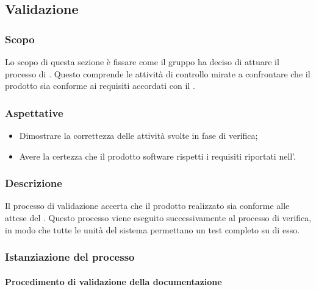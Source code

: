 \subsection{Validazione}
\subsubsection{Scopo}
Lo scopo di questa sezione è fissare come il gruppo ha deciso di attuare il processo di . Questo comprende le attività di controllo mirate a confrontare che il prodotto sia conforme ai requisiti accordati con il .

\subsubsection{Aspettative}
\begin{itemize}
	\item Dimostrare la correttezza delle attività svolte in fase di verifica; 
	\item Avere la certezza che il prodotto software rispetti i requisiti riportati nell'.
\end{itemize}

\subsubsection{Descrizione}
Il processo di validazione accerta che il prodotto realizzato sia conforme alle attese del . Questo processo viene eseguito successivamente al processo di verifica, in modo che tutte le unità del sistema permettano un test completo su di esso.
\subsubsection{Istanziazione del processo}


\paragraph{Procedimento di validazione della documentazione}



